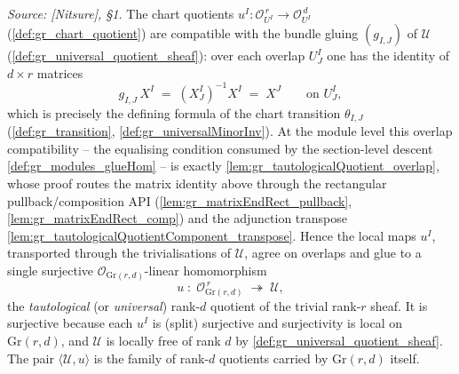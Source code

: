 \begin{definition}


  \label{def:tautological_quotient}
  \textit{Source: [Nitsure], \S 1.}
  The chart quotients \(u^I : \mathcal{O}_{U^I}^{\,r} \to \mathcal{O}_{U^I}^{\,d}\)
  (\cref{def:gr_chart_quotient}) are compatible with the bundle gluing
  \((g_{I,J})\) of \(\mathcal{U}\) (\cref{def:gr_universal_quotient_sheaf}): over
  each overlap \(U^I_J\) one has the identity of \(d \times r\) matrices
  \[
    g_{I,J}\, X^I \;=\; (X^I_J)^{-1} X^I \;=\; X^J \qquad \text{on } U^I_J,
  \]
  which is precisely the defining formula of the chart transition
  \(\theta_{I,J}\) (\cref{def:gr_transition}, \cref{def:gr_universalMinorInv}). At the
  module level this overlap compatibility -- the equalising condition consumed by the
  section-level descent \cref{def:gr_modules_glueHom} -- is exactly
  \cref{lem:gr_tautologicalQuotient_overlap}, whose proof routes the matrix identity above
  through the rectangular pullback/composition API
  (\cref{lem:gr_matrixEndRect_pullback}, \cref{lem:gr_matrixEndRect_comp}) and the
  adjunction transpose \cref{lem:gr_tautologicalQuotientComponent_transpose}.
  Hence the local maps \(u^I\), transported through the trivialisations of
  \(\mathcal{U}\), agree on overlaps and glue to a single surjective
  \(\mathcal{O}_{\mathrm{Gr}(r,d)}\)-linear homomorphism
  \[
    u \;:\; \mathcal{O}_{\mathrm{Gr}(r,d)}^{\,r}
      \;\twoheadrightarrow\; \mathcal{U},
  \]
  the \emph{tautological} (or \emph{universal}) rank-\(d\) quotient of the trivial
  rank-\(r\) sheaf. It is surjective because each \(u^I\) is (split) surjective and
  surjectivity is local on \(\mathrm{Gr}(r,d)\), and \(\mathcal{U}\) is locally
  free of rank \(d\) by \cref{def:gr_universal_quotient_sheaf}. The pair
  \(\langle \mathcal{U}, u \rangle\) is the family of rank-\(d\) quotients carried
  by \(\mathrm{Gr}(r,d)\) itself.
\end{definition}

